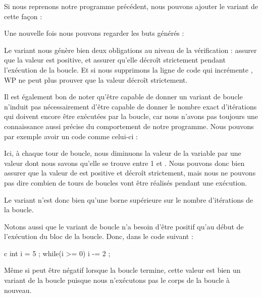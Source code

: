Si nous reprenons notre programme précédent, nous pouvons ajouter le variant
de cette façon :






Une nouvelle fois nous pouvons regarder les buts générés :





Le variant nous génère bien deux obligations au niveau de la vérification : 
assurer que la valeur est positive, et assurer qu'elle décroît strictement pendant
l'exécution de la boucle. Et si nous supprimons la ligne de code qui incrémente
, WP ne peut plus prouver que la valeur  décroît strictement.



Il est également bon de noter qu'être capable de donner un variant de boucle
n'induit pas nécessairement d'être capable de donner le nombre exact d'itérations
qui doivent encore être exécutées par la boucle, car nous n'avons pas toujours une
connaissance aussi précise du comportement de notre programme. Nous pouvons par
 exemple avoir un code comme celui-ci :






Ici, à chaque tour de boucle, nous diminuons la valeur de la variable  par une
valeur dont nous savons qu'elle se trouve entre 1 et . Nous pouvons donc bien 
assurer que la valeur de  est positive et décroît strictement, mais nous ne 
pouvons pas dire combien de tours de boucles vont être réalisés pendant une 
exécution.


Le variant n'est donc bien qu'une borne supérieure sur le nombre d'itérations 
de la boucle.


Notons aussi que le variant de boucle n'a besoin d'être positif qu'au début de l'exécution
du bloc de la boucle. Donc, dans le code suivant :


\begin{CodeBlock}{c}
int i = 5 ;
while(i >= 0){
  i -= 2 ;
}
\end{CodeBlock}


Même si  peut être négatif lorsque la boucle termine, cette valeur est
bien un variant de la boucle puisque nous n'exécutons pas le corps de la boucle à
nouveau.


